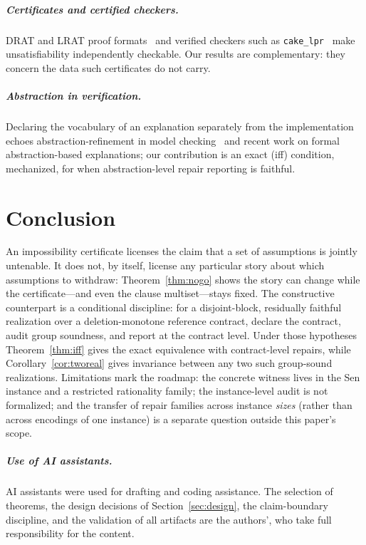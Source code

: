 \documentclass[sigplan,10pt,review,anonymous,nonacm]{acmart}
\theoremstyle{acmdefinition}
\newcommand{\code}[1]{\texttt{#1}}
\begin{document}
\subparagraph*{Certificates and certified checkers.}
DRAT and LRAT proof
formats~\cite{WetzlerHeuleHunt2014,CruzFilipe2017} and verified checkers
such as \code{cake\_lpr}~\cite{TanHeuleMyreen2021} make unsatisfiability
independently checkable. Our results are complementary: they concern the
data such certificates do not carry.

\subparagraph*{Abstraction in verification.} Declaring the vocabulary of an
explanation separately from the implementation echoes abstraction-refinement
in model checking~\cite{Clarke2003CEGAR} and recent work on formal
abstraction-based explanations;
our contribution is an exact
(iff) condition, mechanized, for when abstraction-level repair reporting is
faithful.

\section{Conclusion}
\label{sec:conclusion}

An impossibility certificate licenses the claim that a set of assumptions is
jointly untenable. It does not, by itself, license any particular story about
which assumptions to withdraw: Theorem~\ref{thm:nogo} shows the story can
change while the certificate---and even the clause multiset---stays fixed.
The constructive counterpart is a conditional discipline: for a
disjoint-block, residually faithful realization over a deletion-monotone
reference contract, declare the contract, audit group soundness, and report at
the contract level. Under those hypotheses Theorem~\ref{thm:iff} gives the
exact equivalence with contract-level repairs, while
Corollary~\ref{cor:tworeal} gives invariance between any two such group-sound
realizations.
Limitations mark the roadmap: the concrete witness lives in
the Sen instance and a restricted rationality family; the instance-level audit
is not formalized; and the transfer of repair families across instance
\emph{sizes} (rather than across encodings of one instance) is a separate
question outside this paper's scope.

\subparagraph*{Use of AI assistants.} AI assistants were used for drafting
and coding assistance. The selection of theorems, the design decisions of
Section~\ref{sec:design}, the claim-boundary discipline, and the validation
of all artifacts are the authors', who take full responsibility for the
content.
\end{document}
